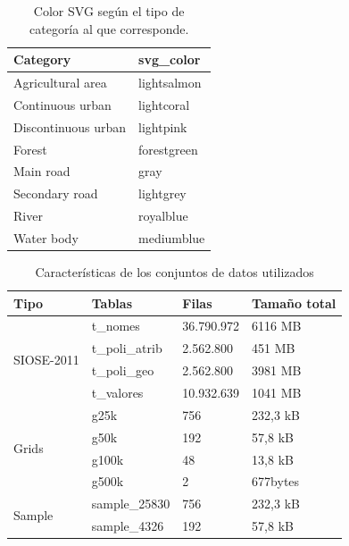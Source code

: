 \begin{table}[]
\centering
\caption{Color SVG según el tipo de categoría al que corresponde.}
\label{my-label}
\begin{tabular}{ll}
\hline
\textbf{Category}   & \textbf{svg\_color} \\ \hline
Agricultural area   & lightsalmon         \\
Continuous urban    & lightcoral          \\
Discontinuous urban & lightpink           \\
Forest              & forestgreen         \\
Main road           & gray                \\
Secondary road      & lightgrey           \\
River               & royalblue           \\
Water body          & mediumblue          \\ \hline
\end{tabular}
\end{table}



\begin{table}[]
\centering
\caption{Características de los conjuntos de datos utilizados\label{tab:datos}}
\begin{tabular}{@{}llll@{}}
\toprule
\textbf{Tipo}               & \textbf{Tablas} & \textbf{Filas} & \textbf{Tamaño total} \\ \midrule
\multirow{4}{*}{SIOSE-2011} & t\_nomes        & 36.790.972     & 6116 MB               \\
                            & t\_poli\_atrib  & 2.562.800      & 451 MB                \\
                            & t\_poli\_geo    & 2.562.800      & 3981 MB               \\
                            & t\_valores      & 10.932.639     & 1041 MB               \\ \midrule
\multirow{4}{*}{Grids}      & g25k            & 756            & 232,3 kB              \\
                            & g50k            & 192            & 57,8 kB               \\
                            & g100k           & 48             & 13,8 kB               \\
                            & g500k           & 2              & 677bytes              \\ \midrule
\multirow{2}{*}{Sample}      & sample\_25830            & 756            & 232,3 kB              \\
                            & sample\_4326            & 192            & 57,8 kB               \\ \bottomrule
\end{tabular}
\end{table}





